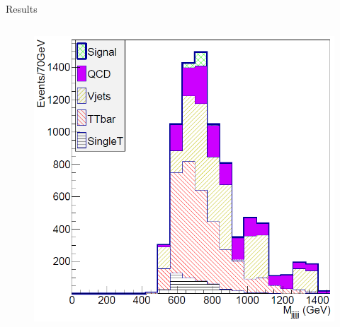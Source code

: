 \begin{frame}{Results}
\begin{columns}
\begin{column}{.50\textwidth}
\begin{figure}[!Hhtbp]
  \begin{center}
    \includegraphics[width=1.0\textwidth]{../figs/Pheno/Final.png}
  \end{center}
\end{figure}
\end{column}
\end{columns}

\end{frame}

\fi

%
%
%
%

